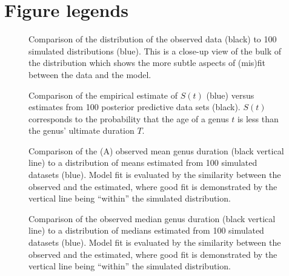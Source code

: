 \documentclass[11pt]{article}
\begin{document}
\newpage{}


\section*{Figure legends}

\begin{figure}[ht]
  \centering
  \caption{ Comparison of the distribution of the observed data (black) to 100 simulated distributions (blue). This is a close-up view of the bulk of the distribution which shows the more subtle aspects of (mis)fit between the data and the model. }
  \label{fig:dens_overlay_zoom}
\end{figure}

\begin{figure}[ht]
  \centering
  \caption{Comparison of the empirical estimate of \(S(t)\) (blue) versus estimates from 100 posterior predictive data sets (black). \(S(t)\) corresponds to the probability that the age of a genus \(t\) is less than the genus' ultimate duration \(T\). }
  \label{fig:surv}
\end{figure}

\begin{figure}[ht]
  \centering
  \caption{Comparison of the (A) observed mean genus duration (black vertical line) to a distribution of means estimated from 100 simulated datasets (blue). Model fit is evaluated by the similarity between the observed and the estimated, where good fit is demonstrated by the vertical line being ``within'' the simulated distribution.}
  \label{fig:ppc_mean}
\end{figure}

\begin{figure}[ht]
  \centering
  \caption{Comparison of the observed median genus duration (black vertical line) to a distribution of medians estimated from 100 simulated datasets (blue). Model fit is evaluated by the similarity between the observed and the estimated, where good fit is demonstrated by the vertical line being ``within'' the simulated distribution. }
  \label{fig:ppc_median}
\end{figure}
\end{document}

